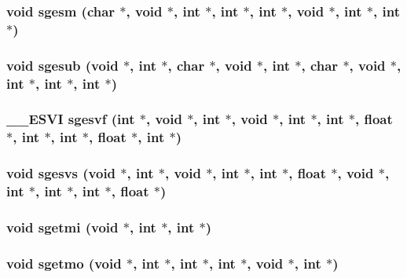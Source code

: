 \subsubsection{\setlength{\rightskip}{0pt plus 5cm}void sgesm (char $\ast$, void $\ast$, int $\ast$, int $\ast$, int $\ast$, void $\ast$, int $\ast$, int $\ast$)}\label{essl_8h_04dedb356ef83dcf910057f0b226f0a3}


\subsubsection{\setlength{\rightskip}{0pt plus 5cm}void sgesub (void $\ast$, int $\ast$, char $\ast$, void $\ast$, int $\ast$, char $\ast$, void $\ast$, int $\ast$, int $\ast$, int $\ast$)}\label{essl_8h_82d1f51ece8ca57a52845c98e0910867}


\subsubsection{\setlength{\rightskip}{0pt plus 5cm}\_\-\_\-ESVI sgesvf (int $\ast$, void $\ast$, int $\ast$, void $\ast$, int $\ast$, int $\ast$, float $\ast$, int $\ast$, int $\ast$, float $\ast$, int $\ast$)}\label{essl_8h_f0f67caddd6b0a9633d32d835cf7e012}


\subsubsection{\setlength{\rightskip}{0pt plus 5cm}void sgesvs (void $\ast$, int $\ast$, void $\ast$, int $\ast$, int $\ast$, float $\ast$, void $\ast$, int $\ast$, int $\ast$, int $\ast$, float $\ast$)}\label{essl_8h_535006813836aacfc38e6f4d995ffc6f}


\subsubsection{\setlength{\rightskip}{0pt plus 5cm}void sgetmi (void $\ast$, int $\ast$, int $\ast$)}\label{essl_8h_0f63e75d1cf1953ca8affbf20e08efc4}


\subsubsection{\setlength{\rightskip}{0pt plus 5cm}void sgetmo (void $\ast$, int $\ast$, int $\ast$, int $\ast$, void $\ast$, int $\ast$)}\label{essl_8h_3ad398cf74bdcafdecd867bf3a68eb84}


